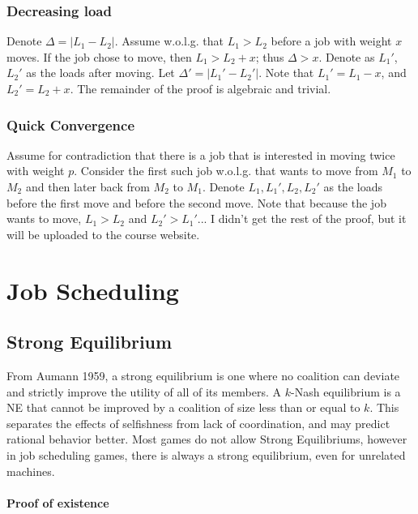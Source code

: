 \documentclass{idc_msc}
\begin{document}
\subsubsection{Decreasing load}

Denote \(\Delta = |L_1 - L_2|\).
Assume w.o.l.g. that \(L_1 > L_2\) before a job with weight \(x\) moves.
If the job chose to move, then \(L_1 > L_2 + x\); thus \(\Delta > x\).
Denote as \(L_1'\), \(L_2'\) as the loads after moving.
Let \(\Delta' = |L_1' - L_2'|\).
Note that \(L_1' = L_1 - x\), and \(L_2' = L_2 + x\).
The remainder of the proof is algebraic and trivial.

\subsubsection{Quick Convergence}

Assume for contradiction that there is a job that is interested in moving twice with weight \(p\).
Consider the first such job w.o.l.g. that wants to move from \(M_1\) to \(M_2\) and then later back from \(M_2\) to \(M_1\).
Denote \(L_1, L_1', L_2, L_2'\) as the loads before the first move and before the second move.
Note that because the job wants to move, \(L_1 > L_2\) and \(L_2' > L_1'\)...
I didn't get the rest of the proof, but it will be uploaded to the course website.

\section{Job Scheduling}

\subsection{Strong Equilibrium}

From Aumann 1959, a strong equilibrium is one where no coalition can deviate and strictly improve the utility of all of its members.
A \(k\)-Nash equilibrium is a NE that cannot be improved by a coalition of size less than or equal to \(k\).
This separates the effects of selfishness from lack of coordination, and may predict rational behavior better.
Most games do not allow Strong Equilibriums, however in job scheduling games, there is always a strong equilibrium, even for unrelated machines.

\paragraph{Proof of existence}
\end{document}
